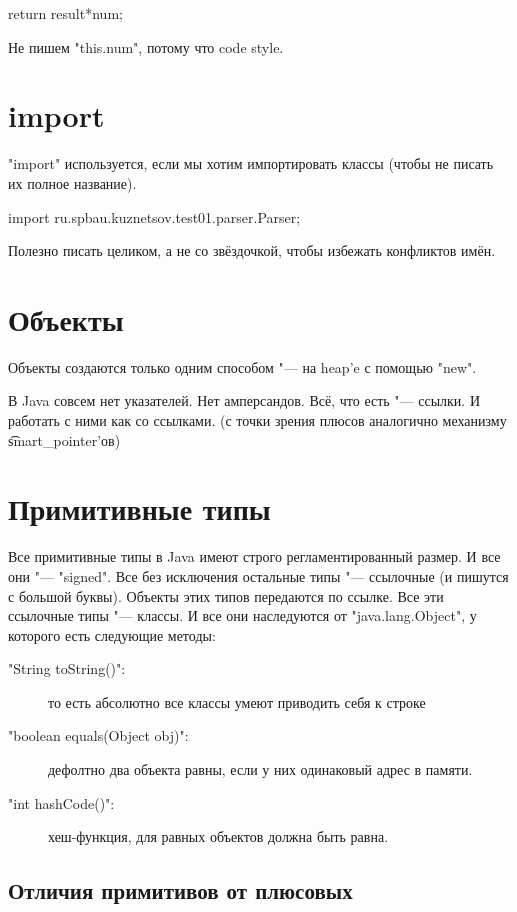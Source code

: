 \begin{javacode}
return result*num;
\end{javacode}
Не пишем \java"this.num", потому что code style.

\section{import}

\java"import" используется, если мы хотим импортировать классы (чтобы не писать их полное название).
\begin{javacode}
import ru.spbau.kuznetsov.test01.parser.Parser;
\end{javacode}
Полезно писать целиком, а не со звёздочкой, чтобы избежать конфликтов имён.

\section{Объекты}

Объекты создаются только одним способом "--- на heap'e с помощью \java"new".

В Java совсем нет указателей.
Нет амперсандов.
Всё, что есть "--- ссылки. И работать с ними как со ссылками.
(с точки зрения плюсов аналогично механизму \t{smart\_pointer}'ов)

\section{Примитивные типы}

Все примитивные типы в Java имеют строго регламентированный размер.
И все они "--- \cpp"signed".
Все без исключения остальные типы "--- ссылочные (и пишутся с большой буквы).
Объекты этих типов передаются по ссылке.
Все эти ссылочные типы "--- классы. И все они наследуются от
\java"java.lang.Object", у которого есть следующие методы:
\begin{description}
\item[\java"String toString()":]
	то есть абсолютно все классы умеют приводить себя к строке

\item[\java"boolean equals(Object obj)":]
	дефолтно два объекта равны, если у них одинаковый адрес в памяти.

\item[\java"int hashCode()":]
	хеш-функция, для равных объектов должна быть равна.
\end{description}

\subsection{Отличия примитивов от плюсовых}

